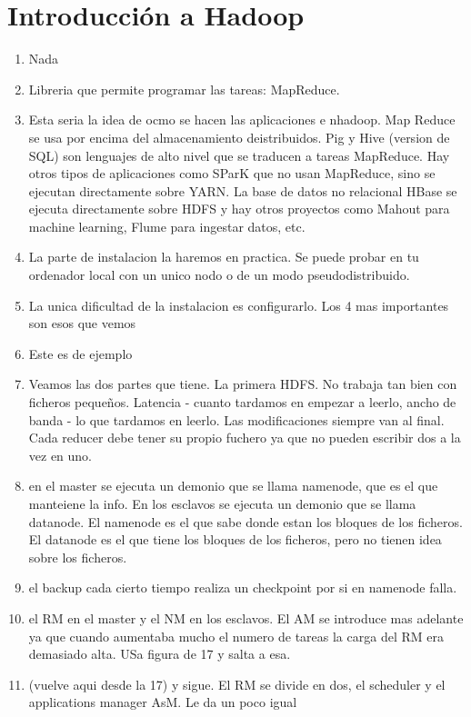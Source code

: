 \chapter{Introducción a Hadoop}\label{Chapter2} 

\begin{enumerate}
\item  Nada
\item Libreria que permite programar las tareas: MapReduce.
\item Esta seria la idea de ocmo se hacen las aplicaciones e nhadoop. Map Reduce se usa por encima del almacenamiento deistribuidos. Pig y Hive (version de SQL) son lenguajes de alto nivel que se traducen a tareas MapReduce. Hay otros tipos de aplicaciones como SParK que no usan MapReduce, sino se ejecutan directamente sobre YARN. La base de datos no relacional HBase se ejecuta directamente sobre HDFS y hay otros proyectos como Mahout para machine learning, Flume para ingestar datos, etc.
\item La parte de instalacion la haremos en practica. Se puede probar en tu ordenador local con un unico nodo o de un modo pseudodistribuido.
\item La unica dificultad de la instalacion es configurarlo. Los 4 mas importantes son esos que vemos
\item Este es de ejemplo
\item Veamos las dos partes que tiene. La primera HDFS. No trabaja tan bien con ficheros pequeños. Latencia - cuanto tardamos en empezar a leerlo, ancho de banda - lo que tardamos en leerlo. Las modificaciones siempre van al final. Cada reducer debe tener su propio fuchero ya que no pueden escribir dos a la vez en uno.
\item en el master se ejecuta un demonio que se llama namenode, que es el que manteiene la info. En los esclavos se ejecuta un demonio que se llama datanode. El namenode es el que sabe donde estan los bloques de los ficheros. El datanode es el que tiene los bloques de los ficheros, pero no tienen idea sobre los ficheros.
\item el backup cada cierto tiempo realiza un checkpoint por si en namenode falla. 
\item el RM en el master y el NM en los esclavos. El AM se introduce mas adelante ya que cuando aumentaba mucho el numero de tareas la carga del RM era demasiado alta. USa figura de 17 y salta a esa.
\item (vuelve aqui desde la 17) y sigue. El RM se divide en dos, el scheduler y el applications manager AsM. Le da un poco igual 

\end{enumerate}
